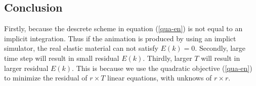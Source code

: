 \documentclass[twocolumn,a4paper]{article}
\begin{document}
\subsection{Conclusion}
Firstly, because the descrete scheme in equation (\ref{qua-en}) is not equal to
an implicit integration. Thus if the animation is produced by using an implict
simulator, the real elastic material can not satisfy $E(k)=0$. Secondly, large
time step will result in small residual $E(k)$. Thirdly, larger $T$ will result
in larger residual $E(k)$. This is because we use the quadratic objective
(\ref{qua-en}) to minimize the residual of $r\times T$ linear equations, with
unknows of $r\times r$.




\end{document}
